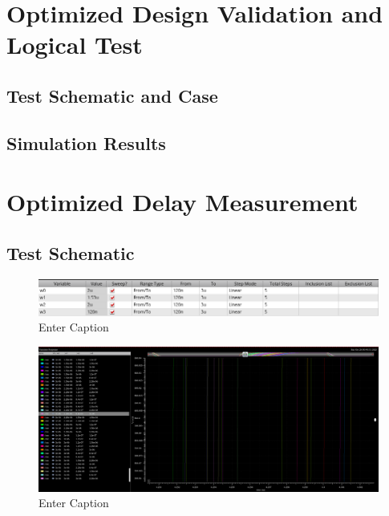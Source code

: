 \documentclass[12pt]{article}
\begin{document}
\newpage

\section{Optimized Design Validation and Logical Test}
\subsection{Test Schematic and Case}



\newpage

\subsection{Simulation Results}



\newpage

\section{Optimized Delay Measurement}
\subsection{Test Schematic}



\newpage

\begin{figure}[H]
    \centering
    \includegraphics[width=0.5\linewidth]{writeup//figures/wmux_all_parametric_sweep_setup.png}
    \caption{Enter Caption}
\end{figure}

\begin{figure}[H]
    \centering
    \includegraphics[width=\linewidth]{writeup//figures/wmux_all_zoomed_parametrics_weep2.png}
    \caption{Enter Caption}
\end{figure}
\end{document}
